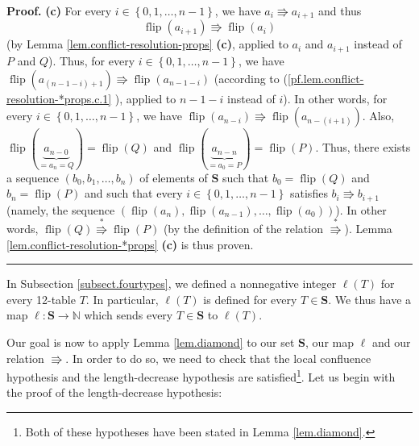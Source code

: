 \documentclass[numbers=enddot,12pt,final,onecolumn,notitlepage]{scrartcl}%
\theoremstyle{definition}
\newenvironment{proof}[1][Proof]{\noindent\textbf{#1.} }{\ \rule{0.5em}{0.5em}}
\begin{document}
\begin{proof}
\textbf{(c)} For every $i\in\left\{  0,1,\ldots,n-1\right\}  $, we have
$a_{i}\Rrightarrow a_{i+1}$ and thus
\begin{equation}
\operatorname*{flip}\left(  a_{i+1}\right)  \Rrightarrow\operatorname*{flip}%
\left(  a_{i}\right)  \label{pf.lem.conflict-resolution-*props.c.1}%
\end{equation}
(by Lemma \ref{lem.conflict-resolution-props} \textbf{(c)}, applied to $a_{i}$
and $a_{i+1}$ instead of $P$ and $Q$). Thus, for every $i\in\left\{
0,1,\ldots,n-1\right\}  $, we have $\operatorname*{flip}\left(  a_{\left(
n-1-i\right)  +1}\right)  \Rrightarrow\operatorname*{flip}\left(
a_{n-1-i}\right)  $ (according to (\ref{pf.lem.conflict-resolution-*props.c.1}%
), applied to $n-1-i$ instead of $i$). In other words, for every $i\in\left\{
0,1,\ldots,n-1\right\}  $, we have $\operatorname*{flip}\left(  a_{n-i}%
\right)  \Rrightarrow\operatorname*{flip}\left(  a_{n-\left(  i+1\right)
}\right)  $. Also, $\operatorname*{flip}\left(  \underbrace{a_{n-0}}%
_{=a_{n}=Q}\right)  =\operatorname*{flip}\left(  Q\right)  $ and
$\operatorname*{flip}\left(  \underbrace{a_{n-n}}_{=a_{0}=P}\right)
=\operatorname*{flip}\left(  P\right)  $. Thus, there exists a sequence
$\left(  b_{0},b_{1},\ldots,b_{n}\right)  $ of elements of $\mathbf{S}$ such
that $b_{0}=\operatorname*{flip}\left(  Q\right)  $ and $b_{n}%
=\operatorname*{flip}\left(  P\right)  $ and such that every $i\in\left\{
0,1,\ldots,n-1\right\}  $ satisfies $b_{i}\Rrightarrow b_{i+1}$ (namely, the
sequence $\left(  \operatorname*{flip}\left(  a_{n}\right)
,\operatorname*{flip}\left(  a_{n-1}\right)  ,\ldots,\operatorname*{flip}%
\left(  a_{0}\right)  \right)  $). In other words, $\operatorname*{flip}%
\left(  Q\right)  \overset{\ast}{\Rrightarrow}\operatorname*{flip}\left(
P\right)  $ (by the definition of the relation $\overset{\ast}{\Rrightarrow}%
$). Lemma \ref{lem.conflict-resolution-*props} \textbf{(c)} is thus proven.
\end{proof}

In Subsection \ref{subsect.fourtypes}, we defined a nonnegative integer
$\ell\left(  T\right)  $ for every 12-table $T$. In particular, $\ell\left(
T\right)  $ is defined for every $T\in\mathbf{S}$. We thus have a map
$\ell:\mathbf{S}\rightarrow\mathbb{N}$ which sends every $T\in\mathbf{S}$ to
$\ell\left(  T\right)  $.

Our goal is now to apply Lemma \ref{lem.diamond} to our set $\mathbf{S}$, our
map $\ell$ and our relation $\Rrightarrow$. In order to do so, we need to
check that the local confluence hypothesis and the length-decrease hypothesis
are satisfied\footnote{Both of these hypotheses have been stated in Lemma
\ref{lem.diamond}.}. Let us begin with the proof of the length-decrease hypothesis:
\end{document}
